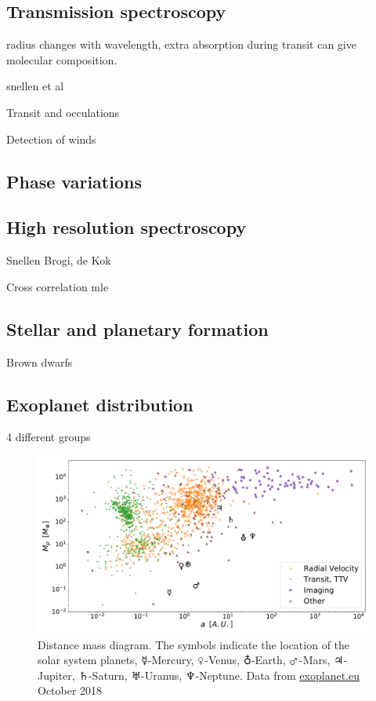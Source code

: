 \subsection{Transmission spectroscopy}
radius changes with wavelength, extra absorption during transit can give molecular composition.

snellen  et al


Transit and occulations~\citet{winn_transits_2010}

Detection of winds


\subsection{Phase variations}



\subsection{High resolution spectroscopy}
Snellen  Brogi, de Kok

Cross correlation mle  \citet{piskorz_evidence_2016}



\subsection{Stellar and planetary formation}

Brown dwarfs

\subsection{Exoplanet distribution} 4 different groups

\fref{}


\begin{figure}
    \centering
    \includegraphics[width=0.7\linewidth]{./figures/introduction/exoplanetEU_a_mass.pdf}
    \caption{Distance mass diagram.
     The symbols indicate the location of the solar system planets, $\mercury$-Mercury, $\venus$-Venus, $\earth$-Earth, $\mars$-Mars, $\jupiter$-Jupiter, $\saturn$-Saturn, $\uranus$-Uranus, $\neptune$-Neptune. Data from \href{http://ww.exoplanet.eu}{exoplanet.eu} October 2018}
    \label{fig:pltoverlayadd}
\end{figure}


